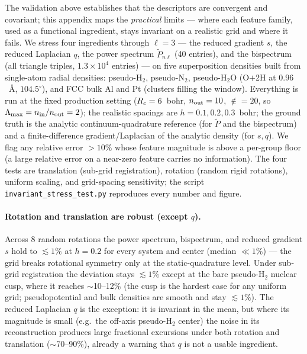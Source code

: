 The validation above establishes that the descriptors are convergent and covariant;
this appendix maps the \emph{practical} limits --- where each feature family, used as
a functional ingredient, stays invariant on a realistic grid and where it fails. We
stress four ingredients through $\ell=3$ --- the reduced gradient $s$, the reduced
Laplacian $q$, the power spectrum $\tilde P_{n\ell}$ (40 entries), and the bispectrum
(all triangle triples, $1.3\times10^4$ entries) --- on five superposition densities
built from single-atom radial densities: pseudo-H$_2$, pseudo-N$_2$, pseudo-H$_2$O
(O$+$2H at $0.96$~\AA, $104.5^\circ$), and FCC bulk Al and Pt (clusters filling the
window). Everything is run at the fixed production setting ($R_{c}=6$~bohr, $n_{\mathrm{out}}=10$,
$\nin=20$, so $\Lambda_{\max}=n_{\mathrm{in}}/n_{\mathrm{out}}=2$); the realistic spacings are
$h=0.1,0.2,0.3$~bohr; the
ground truth is the analytic continuum-quadrature reference (for $\tilde P$ and the
bispectrum) and a finite-difference gradient/Laplacian of the analytic density (for
$s,q$). We flag any relative error $>10\%$ whose feature magnitude is above a
per-group floor (a large relative error on a near-zero feature carries no
information). The four tests are translation (sub-grid registration), rotation
(random rigid rotations), uniform scaling, and grid-spacing sensitivity; the script
\texttt{invariant\_stress\_test.py} reproduces every number and figure.

\paragraph*{Rotation and translation are robust (except $q$).}
Across 8 random rotations the power spectrum, bispectrum, and reduced gradient $s$ hold
to $\lesssim1\%$ at $h=0.2$ for every system and center (median $\ll1\%$) --- the grid
breaks rotational symmetry only at the static-quadrature level. Under sub-grid
registration the deviation stays $\lesssim1\%$ except at the bare pseudo-H$_2$ nuclear
cusp, where it reaches $\sim$10--12\% (the cusp is the hardest case for any uniform
grid; pseudopotential and bulk densities are smooth and stay $\lesssim1\%$). The reduced
Laplacian $q$ is the exception: it is invariant in the mean, but where its magnitude is
small (e.g.\ the off-axis pseudo-H$_2$ center) the noise in its reconstruction produces
large fractional excursions under both rotation and translation ($\sim$70--90\%),
already a warning that $q$ is not a usable ingredient.

